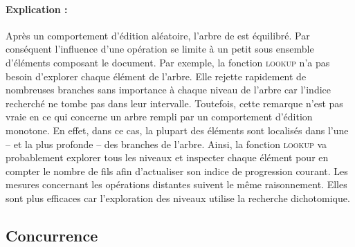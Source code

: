 \paragraph{Explication :} Après un comportement d'édition aléatoire, l'arbre de
\LSEQ est équilibré. Par conséquent l'influence d'une opération se limite à un
petit sous ensemble d'éléments composant le document. Par exemple, la fonction
\textsc{lookup} n'a pas besoin d'explorer chaque élément de l'arbre. Elle rejette
rapidement de nombreuses branches sans importance à chaque niveau de l'arbre
car l'indice recherché ne tombe pas dans leur intervalle. Toutefois, cette
remarque n'est pas vraie en ce qui concerne un arbre rempli par un comportement
d'édition monotone. En effet, dans ce cas, la plupart des éléments sont
localisés dans l'une -- et la plus profonde -- des branches de l'arbre. Ainsi,
la fonction \textsc{lookup} va probablement explorer tous les niveaux et
inspecter chaque élément pour en compter le nombre de fils afin d'actualiser son
indice de progression courant. Les mesures concernant les opérations distantes
suivent le même raisonnement. Elles sont plus efficaces car l'exploration des
niveaux utilise la recherche dichotomique.


\subsection{Concurrence}

